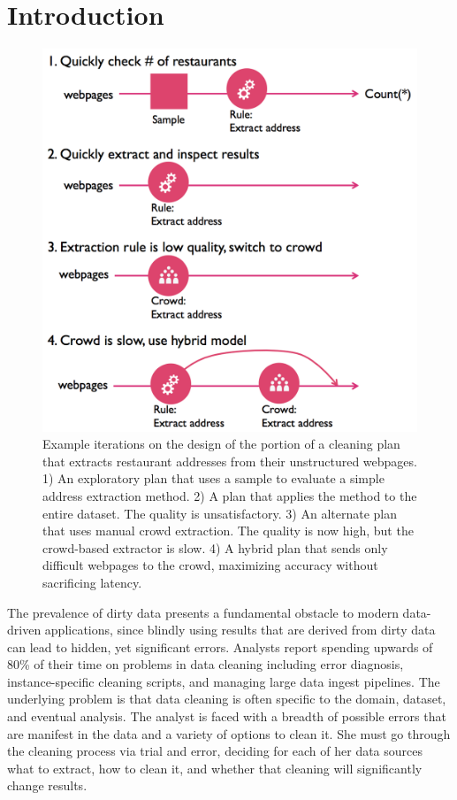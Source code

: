 \section{Introduction}\label{sec:intro}

\begin{figure}[t]
\centering
\vspace{-0.5cm}
\includegraphics[width = .4\textwidth]{figs/lifecycle.png}
\vspace{-0.4cm}
\caption{Example iterations on the design of the portion of a cleaning plan that extracts restaurant addresses from their unstructured webpages.  
1) An exploratory plan that uses a sample to evaluate a simple address extraction method.
2) A plan that applies the method to the entire dataset. The quality is unsatisfactory. 
3) An alternate plan that uses manual crowd extraction. The quality is now high, but the crowd-based extractor is slow. 
4) A hybrid plan that sends only difficult webpages to the crowd, maximizing accuracy without sacrificing latency.}
\label{fig:ex-plan}
\vspace{-0.6cm}
\end{figure}

%
%
The prevalence of dirty data presents a fundamental obstacle to modern data-driven applications, since 
blindly using results that are derived from dirty data can lead to hidden, yet significant errors.
Analysts report spending upwards of 80\% of their time on problems in data cleaning \cite{kandel2012} including 
error diagnosis, instance-specific cleaning scripts, and managing large data ingest pipelines.
The underlying problem is that data cleaning is often specific to the domain, dataset, and eventual analysis.
The analyst is faced with a breadth of possible errors that are manifest in the data and a variety of options to clean it.
She must go through the cleaning process via trial and error, deciding for each of her data sources what to extract, how to clean it, and whether that cleaning will significantly change results.


